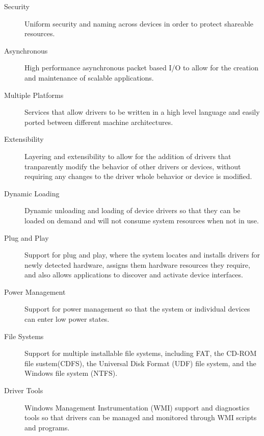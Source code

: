 \documentclass[letterpaper,draftclsnofoot,10pt,onecolumn,titlepage]{IEEEtran}\usepackage[margin=0.75in]{geometry}
\begin{document}
\begin{description}

    \item[Security] 
    Uniform security and naming across devices in order to protect shareable resources.
    
    \item[Asynchronous]
    High performance asynchronous packet based I/O to allow for the creation and maintenance of scalable 
    applications.
    
    \item[Multiple Platforms]
    Services that allow drivers to be written in a high level language and easily ported between different 
    machine architectures.
    
    \item[Extensibility]
    Layering and extensibility to allow for the addition of drivers that tranparently modify the behavior 
    of other drivers or devices, without requiring any changes to the driver whole behavior or device is 
    modified.
    
    \item[Dynamic Loading]
    Dynamic unloading and loading of device drivers so that they can be loaded on demand and will not 
    consume system resources when not in use.
    
    \item[Plug and Play]
    Support for plug and play, where the system locates and installs drivers for newly detected hardware, 
    assigns them hardware resources they require, and also allows applications to discover and activate 
    device interfaces.
    
    \item[Power Management]
    Support for power management so that the system or individual devices can enter low power states.
    
    \item[File Systems]
    Support for multiple installable file systems, including FAT, the CD-ROM file sustem(CDFS), the 
    Universal Disk Format (UDF) file system, and the Windows file system (NTFS).
    
    \item[Driver Tools]
    Windows Management Instrumentation (WMI) support and diagnostics tools so that drivers can be managed 
    and monitored through WMI scripts and programs.
    
\end{description}
\end{document}
